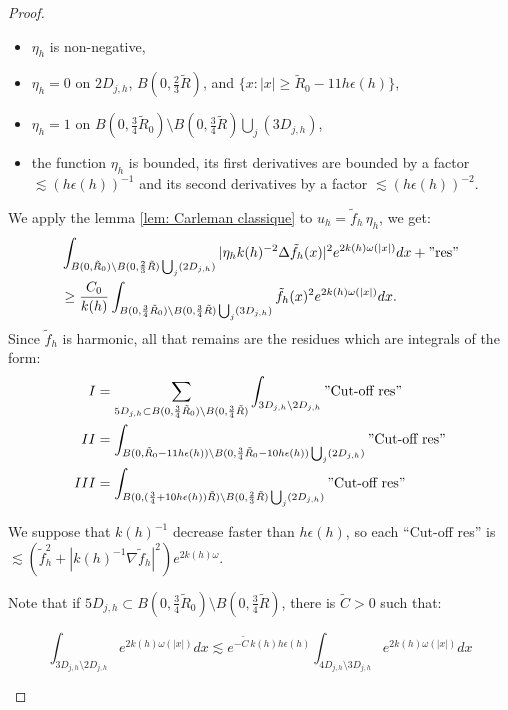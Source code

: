 \documentclass[leqno,11pt,letterpaper, english]{amsart}
\newcommand{\nn}{\nonumber}
\theoremstyle{plain}
\theoremstyle{definition}
\numberwithin{equation}{section}
\begin{document}
\begin{proof}
\begin{itemize}
			\begin{itemize}
				\item $\eta_h$ is non-negative,
				\item $\eta_h=0$ on $2D_{j,h}$, $B(0,\frac{2}{3}\tilde{R})$, and $\{x:|x|\geq \tilde{R}_0-11h\epsilon(h)\}$,
				\item $\eta_h=1$ on $B(0,\frac{3}{4}\tilde{R}_0)\setminus B(0,\frac{3}{4}\tilde{R})\bigcup_j(3D_{j,h})$,
				\item the function $\eta_h$ is bounded, its first derivatives are bounded by a factor $\lesssim{(h\epsilon(h))^{-1}}$ and its second derivatives  by a factor $\lesssim{(h\epsilon(h))^{-2}}$.
			\end{itemize}
			We apply the lemma \ref{lem: Carleman classique} to $u_h=\tilde{f}_h\,\eta_h$, we get:
			\begin{align}
				\label{eq:CarlLogsanscompact}
				&\int_{B(0,\tilde{R}_0)\setminus B(0,\frac{2}{3}\tilde{R})\bigcup_j(2D_{j,h})} |\eta_h k(h)^{-2}\Delta \tilde{f}_h(x)|^2 e^{2k(h)\omega(|x|)}dx + "\mbox{res}"\nn\\
				&\geq \frac{C_0}{k(h)}\int_{B(0,\frac{3}{4}\tilde{R}_0)\setminus B(0,\frac{3}{4}\tilde{R})\bigcup_j(3D_{j,h})} \tilde{f}_h(x)^2 e^{2k(h)\omega(|x|)}dx.
			\end{align}
Since $\tilde{f}_h$ is harmonic, all that remains are the residues which are integrals of the form:
			\begin{align}
				I&=\sum_{5D_{j,h}\subset B(0,\frac{3}{4}\tilde{R}_0)\setminus B(0,\frac{3}{4}\tilde{R})}\int_{3D_{j,h}\setminus2D_{j,h}} "\mbox{Cut-off res}"\\
				II&=\int_{B(0,\tilde{R}_0-11h\epsilon(h))\setminus B(0,\frac{3}{4}\tilde{R}_0-10h\epsilon(h))\bigcup_j(2D_{j,h})}"\mbox{Cut-off res}"\\
				III&= \int_{B(0,(\frac{3}{4}+10h\epsilon(h))\tilde{R})\setminus B(0,\frac{2}{3}\tilde{R})\bigcup_j(2D_{j,h})}"\mbox{Cut-off res}"
			\end{align}
			
			We suppose that $k(h)^{-1}$ decrease faster than $h\epsilon(h)$, so each “Cut-off res” is $\lesssim(\tilde{f}_h^2 +|k(h)^{-1} \nabla \tilde{f}_h|^2)e^{2k(h)\omega}$.
			
			 Note that if $5D_{j,h}\subset B(0,\frac{3}{4}\tilde{R}_0)\setminus B(0,\frac{3}{4}\tilde{R})$,  there is $\tilde{C}>0$ such that:
			
			\begin{equation}
				\int_{3D_{j,h}\setminus 2D_{j,h}}e^{2k(h)\omega(|x|)}dx\lesssim e^{-\tilde{C}\,k(h)h\epsilon(h)}\int_{4D_{j,h}\setminus 3D_{j,h}}e^{2k(h)\omega(|x|)}dx
			\end{equation}
			

\end{itemize}
\end{proof}
\end{document}
